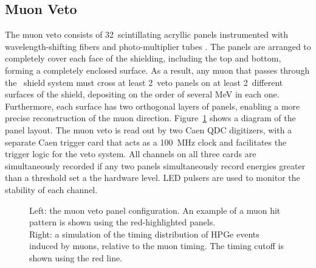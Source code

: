 \documentclass[/main.tex]{subfiles}
\begin{document}
\subsection{Muon Veto}\label{sec:muonveto}
The muon veto consists of 32~scintillating acryllic panels instrumented with wavelength-shifting fibers and photo-multiplier tubes \cite{2015wiseman}.
The panels are arranged to completely cover each face of the shielding, including the top and bottom, forming a completely enclosed surface.
As a result, any muon that passes through the \MJD\ shield system must cross at least 2~veto panels on at least 2~different surfaces of the shield, depositing on the order of several MeV in each one.
Furthermore, each surface has two orthogonal layers of panels, enabling a more precise reconstruction of the muon direction.
Figure~\ref{fig:muonveto} shows a diagram of the panel layout.
The muon veto is read out by two Caen QDC digitizers, with a separate Caen trigger card that acts as a 100~MHz clock and facilitates the trigger logic for the veto system.
All channels on all three cards are simultaneously recorded if any two panels simultaneously record energies greater than a threshold set a the hardware level.
LED pulsers are used to monitor the stability of each channel.
\\
\begin{figure}
  \centering
  \caption[Muon veto system]{\label{fig:muonveto}
    Left: the muon veto panel configuration. An example of a muon hit pattern is shown using the red-highlighted panels.\\
    Right: a simulation of the timing distribution of HPGe events induced by muons, relative to the muon timing. The timing cutoff is shown using the red line.
  }
\end{figure}
\end{document}
